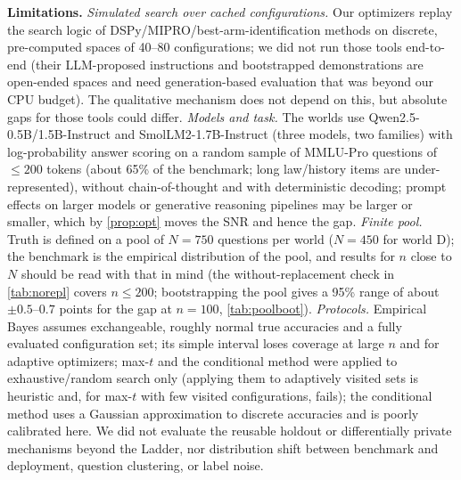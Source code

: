 \textbf{Limitations.} \emph{Simulated search over cached configurations.} Our optimizers replay the search logic of DSPy/MIPRO/best-arm-identification methods on discrete, pre-computed spaces of 40--80 configurations; we did not run those tools end-to-end (their LLM-proposed instructions and bootstrapped demonstrations are open-ended spaces and need generation-based evaluation that was beyond our CPU budget). The qualitative mechanism does not depend on this, but absolute gaps for those tools could differ. \emph{Models and task.} The worlds use Qwen2.5-0.5B/1.5B-Instruct and SmolLM2-1.7B-Instruct (three models, two families) with log-probability answer scoring on a random sample of MMLU-Pro questions of $\le 200$ tokens (about 65\% of the benchmark; long law/history items are under-represented), without chain-of-thought and with deterministic decoding; prompt effects on larger models or generative reasoning pipelines may be larger or smaller, which by \cref{prop:opt} moves the SNR and hence the gap. \emph{Finite pool.} Truth is defined on a pool of $N{=}750$ questions per world ($N{=}450$ for world D); the benchmark is the empirical distribution of the pool, and results for $n$ close to $N$ should be read with that in mind (the without-replacement check in \cref{tab:norepl} covers $n\le 200$; bootstrapping the pool gives a 95\% range of about $\pm0.5$--$0.7$ points for the gap at $n{=}100$, \cref{tab:poolboot}). \emph{Protocols.} Empirical Bayes assumes exchangeable, roughly normal true accuracies and a fully evaluated configuration set; its simple interval loses coverage at large $n$ and for adaptive optimizers; max-$t$ and the conditional method were applied to exhaustive/random search only (applying them to adaptively visited sets is heuristic and, for max-$t$ with few visited configurations, fails); the conditional method uses a Gaussian approximation to discrete accuracies and is poorly calibrated here. We did not evaluate the reusable holdout or differentially private mechanisms beyond the Ladder, nor distribution shift between benchmark and deployment, question clustering, or label noise.
